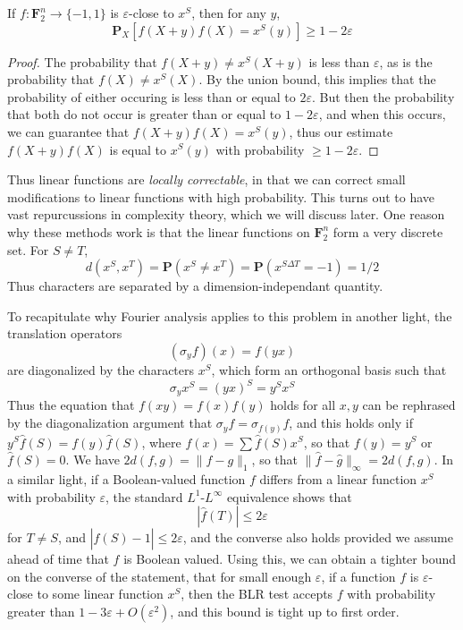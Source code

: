 \begin{theorem}
    If $f: \mathbf{F}_2^n \to \{ -1, 1 \}$ is $\varepsilon$-close to $x^S$, then for any $y$,
    \[ \mathbf{P}_X[f(X + y)f(X) = x^S(y)] \geq 1 - 2 \varepsilon \]
\end{theorem}
\begin{proof}
    The probability that $f(X + y) \neq x^S(X + y)$ is less than $\varepsilon$, as is the probability that $f(X) \neq x^S(X)$. By the union bound, this implies that the probability of either occuring is less than or equal to $2\varepsilon$. But then the probability that both do not occur is greater than or equal to $1 - 2\varepsilon$, and when this occurs, we can guarantee that $f(X + y)f(X) = x^S(y)$, thus our estimate $f(X + y)f(X)$ is equal to $x^S(y)$ with probability $\geq 1 - 2 \varepsilon$.
\end{proof}

Thus linear functions are {\it locally correctable}, in that we can correct small modifications to linear functions with high probability. This turns out to have vast repurcussions in complexity theory, which we will discuss later. One reason why these methods work is that the linear functions on $\mathbf{F}_2^n$ form a very discrete set. For $S \neq T$,
%
\[ d(x^S,x^T) = \mathbf{P}(x^S \neq x^T) = \mathbf{P}(x^{S \Delta T} = -1) = 1/2 \]
%
Thus characters are separated by a dimension-independant quantity.

To recapitulate why Fourier analysis applies to this problem in another light, the translation operators
%
\[ (\sigma_y f)(x) = f(yx) \]
%
are diagonalized by the characters $x^S$, which form an orthogonal basis such that
%
\[ \sigma_y x^S = (yx)^S = y^S x^S \]
%
Thus the equation that $f(xy) = f(x)f(y)$ holds for all $x,y$ can be rephrased by the diagonalization argument that $\sigma_y f = \sigma_{f(y)} f$, and this holds only if $y^S \widehat{f}(S) = f(y) \widehat{f}(S)$, where $f(x) = \sum \widehat{f}(S) x^S$, so that $f(y) = y^S$ or $\widehat{f}(S) = 0$. We have $2d(f,g) = \| f - g \|_1$, so that $\| \widehat{f} - \widehat{g} \|_\infty = 2d(f,g)$. In a similar light, if a Boolean-valued function $f$ differs from a linear function $x^S$ with probability $\varepsilon$, the standard $L^1$-$L^\infty$ equivalence shows that
%
\[ | \widehat{f}(T) | \leq 2\varepsilon \]
%
for $T \neq S$, and $|\widehat{f}(S) - 1| \leq 2\varepsilon$, and the converse also holds provided we assume ahead of time that $f$ is Boolean valued. Using this, we can obtain a tighter bound on the converse of the statement, that for small enough $\varepsilon$, if a function $f$ is $\varepsilon$-close to some linear function $x^S$, then the BLR test accepts $f$ with probability greater than $1 - 3 \varepsilon + O(\varepsilon^2)$, and this bound is tight up to first order.

